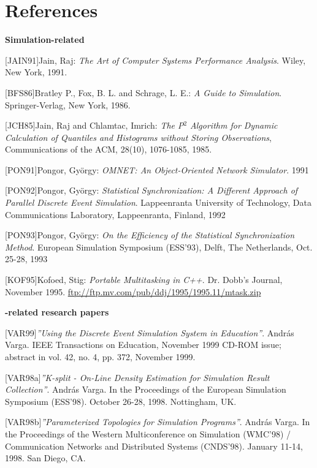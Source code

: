 
\chapter{References}
\label{cha:references}

\textbf{Simulation-related}


[JAIN91]\tab Jain, Raj: \textit{The Art of Computer Systems Performance
Analysis}. Wiley, New York, 1991.

[BFS86]\tab Bratley P., Fox, B. L. and Schrage, L. E.: \textit{A Guide
to Simulation}. Springer-Verlag, New York, 1986.

[JCH85]\tab Jain, Raj and Chlamtac, Imrich: \textit{The P}$^{\mathit{2}}$ \textit{Algorithm
for Dynamic Calculation of Quantiles and Histograms without Storing
Observations}, Communications of the ACM, 28(10), 1076-1085, 1985.

[PON91]\tab Pongor, Gy\"{o}rgy: \textit{OMNET: An Object-Oriented Network
Simulator}. 1991

[PON92]\tab Pongor, Gy\"{o}rgy: \textit{Statistical Synchronization: A Different
Approach of Parallel Discrete Event Simulation}. Lappeenranta
University of Technology, Data Communications Laboratory, Lappeenranta,
Finland, 1992

[PON93]\tab Pongor, Gy\"{o}rgy: \textit{On the Efficiency of the Statistical
Synchronization Method}. European Simulation Symposium (ESS'93),
Delft, The Netherlands, Oct. 25-28, 1993

[KOF95]\tab Kofoed, Stig: \textit{Portable Multitasking in C++}. Dr. Dobb's
Journal, November 1995. \href{ftp://ftp.mv.com/pub/ddj/1995/1995.11/mtask.zip}{ftp://ftp.mv.com/pub/ddj/1995/1995.11/mtask.zip}


\textbf{{\opp}-related research papers}


[VAR99]\tab \textit{''Using the {\opp} Discrete Event Simulation
System in Education''}. Andr\'{a}s Varga. IEEE Transactions
on Education, November 1999 CD-ROM issue; abstract in vol. 42,
no. 4, pp. 372, November 1999.

[VAR98a]\tab \textit{''K-split - On-Line Density Estimation for
Simulation Result Collection''}. Andr\'{a}s Varga. In the
Proceedings of the European Simulation Symposium (ESS'98). October
26-28, 1998. Nottingham, UK.

[VAR98b]\tab \textit{''Parameterized Topologies for Simulation Programs''}.
Andr\'{a}s Varga. In the Proceedings of the Western Multiconference
on Simulation (WMC'98) / Communication Networks and Distributed
Systems (CNDS'98). January 11-14, 1998. San Diego, CA.

